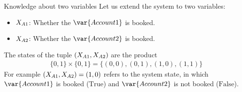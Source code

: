 \documentclass{beamer}
\begin{document}
    \begin{frame}{Knowledge about two variables}
        Let us extend the system to two variables:
        \begin{itemize}
            \item $X_{A1}$: Whether the $\var{Account 1}$ is booked.
            \item $X_{A2}$: Whether the $\var{Account 2}$ is booked.
        \end{itemize}
        The states of the tuple $(X_{A1},X_{A2})$ are the product
        \begin{align*}
            \{0,1\} \times \{0,1\} = \{(0,0),(0,1),(1,0),(1,1)\}
        \end{align*}
        For example $(X_{A1},X_{A2})=(1,0)$ refers to the system state, in which $\var{Account 1}$ is booked ($\mathrm{True}$) and $\var{Account 2}$ is not booked ($\mathrm{False}$).

        \begin{center}
        \end{center}
    \end{frame}
\end{document}
